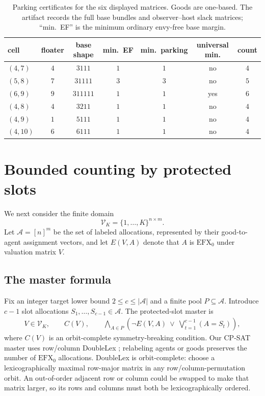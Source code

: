 \documentclass[11pt]{article}
\theoremstyle{plain}
\theoremstyle{definition}
\newcommand{\efxo}{\mathrm{EFX}_0}
\begin{document}
\begin{table}[t]
\centering
\begin{tabular}{@{}lcccccc@{}}
\toprule
cell & floater & base shape & min.\ EF & min.\ parking & universal min. & count\\
\midrule
$(4,7)$  & $4$ & $3111$   & $1$ & $1$ & no  & $4$\\
$(5,8)$  & $7$ & $31111$  & $3$ & $3$ & no  & $5$\\
$(6,9)$  & $9$ & $311111$ & $1$ & $1$ & yes & $6$\\
$(4,8)$  & $4$ & $3211$   & $1$ & $1$ & no  & $4$\\
$(4,9)$  & $1$ & $5111$   & $1$ & $1$ & no  & $4$\\
$(4,10)$ & $6$ & $6111$   & $1$ & $1$ & no  & $4$\\
\bottomrule
\end{tabular}
\caption{Parking certificates for the six displayed matrices.  Goods are
one-based.  The artifact records the full base bundles and observer--host slack
matrices; ``min.\ EF'' is the minimum ordinary envy-free base margin.}
\label{tab:parking}
\end{table}

\section{Bounded counting by protected slots}\label{sec:cegar}

We next consider the finite domain
\[
 \mathcal V_K=\{1,\ldots,K\}^{n\times m}.
\]
Let $\mathcal A=[n]^m$ be the set of labeled allocations, represented by their
good-to-agent assignment vectors, and let $E(V,A)$ denote that $A$ is $\efxo$
under valuation matrix $V$.

\subsection{The master formula}

Fix an integer target lower bound $2\le c\le|\mathcal A|$ and a finite pool
$P\subseteq\mathcal A$.  Introduce
$c-1$ slot allocations $S_1,\ldots,S_{c-1}\in\mathcal A$.  The protected-slot
master is
\begin{equation}\label{eq:master}
\begin{split}
 V\in\mathcal V_K,\qquad C(V),\qquad
 \bigwedge_{A\in P}
 \left(
   \neg E(V,A)\ \lor\
   \bigvee_{t=1}^{c-1}(A=S_t)
 \right),
\end{split}
\end{equation}
where $C(V)$ is an orbit-complete symmetry-breaking condition.  Our CP-SAT
master uses row/column DoubleLex \cite{Flener2002}; relabeling agents or goods
preserves the number of $\efxo$ allocations.
DoubleLex is orbit-complete: choose a lexicographically maximal row-major
matrix in any row/column-permutation orbit.  An out-of-order adjacent row or
column could be swapped to make that matrix larger, so its rows and columns
must both be lexicographically ordered.
\end{document}
